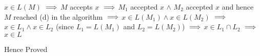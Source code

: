 \begin{enumerate}
\begin{enumerate}
$x \in L(M)$
$
\newline
\Longrightarrow
$
$M$ accepts $x$
$
\newline
\Longrightarrow
$
$M_1$ accepted $x$ $\land$ $M_2$ accepted $x$  \newline
and hence $M$ reached (d)
in the algorithm
$
\newline
\Longrightarrow
$
$x \in L(M_1) \land x \in L(M_2)$
$
\newline
\Longrightarrow
$
$x \in L_1 \land x \in L_2$ (since $L_1 = L(M_1)$ and $L_2 = L(M_2)$)
$
\newline
\Longrightarrow
$
$x \in L_1 \cap L_2$
$
\newline
\Longrightarrow
$
$x \in L$


    \end{enumerate}
    
Hence Proved








\end{enumerate}

